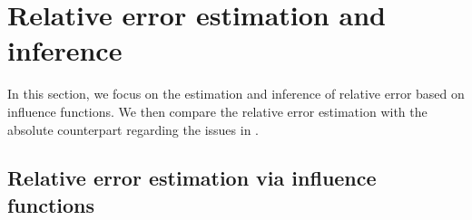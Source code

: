 \documentclass{article}
\newcommand{\zg}[1]{{\color{blue} [ZG: #1]}}
\theoremstyle{plain}
\theoremstyle{definition}
\theoremstyle{plain}
\begin{document}




\section{Relative error estimation and inference}\label{sec:relative.error}


In this section, we focus on the estimation and inference of relative error based on influence functions. We then compare the relative error estimation with the absolute counterpart regarding the issues in .


\subsection{Relative error estimation via influence functions}\label{sec:relative.error.estimation}
\end{document}
